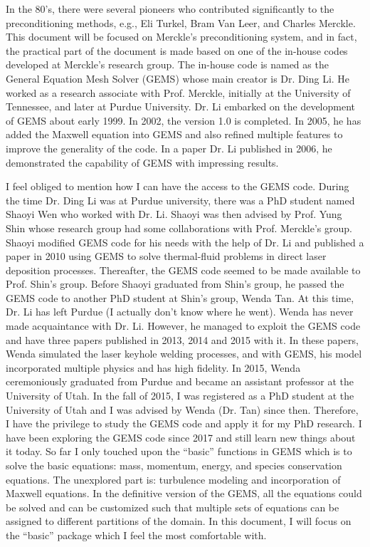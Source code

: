 \documentclass[12pt, letterpaper]{report}
\begin{document}
In the 80's, there were several pioneers who contributed significantly to the preconditioning
methods, e.g., Eli Turkel, Bram Van Leer, and Charles Merckle. This document will be focused on
Merckle's preconditioning system, and in fact, the practical part of the document is made based on
one of the in-house codes developed at Merckle's research group. The in-house code is named as the
General Equation Mesh Solver (GEMS) whose main creator is Dr. Ding Li. He worked as a research
associate with Prof. Merckle, initially at the University of Tennessee, and later at Purdue
University. Dr. Li embarked on the development of GEMS about early 1999. In 2002, the version 1.0 is
completed. In 2005, he has added the Maxwell equation into GEMS and also refined multiple features
to improve the generality of the code. In a paper Dr. Li published in 2006, he demonstrated the
capability of GEMS with impressing results.
\paraspace

I feel obliged to mention how I can have the access to the GEMS code. During the time Dr. Ding Li
was at Purdue university, there was a PhD student named Shaoyi Wen who worked with Dr. Li. Shaoyi
was then advised by Prof. Yung Shin whose research group had some collaborations with Prof.
Merckle's group. Shaoyi modified GEMS code for his needs with the help of Dr. Li and published a
paper in 2010 using GEMS to solve thermal-fluid problems in direct laser deposition processes.
Thereafter, the GEMS code seemed to be made available to Prof. Shin's group. Before Shaoyi graduated
from Shin's group, he passed the GEMS code to another PhD student at Shin's group, Wenda Tan. At
this time, Dr. Li has left Purdue (I actually don't know where he went). Wenda has never made
acquaintance with Dr. Li. However, he managed to exploit the GEMS code and have three papers
published in 2013, 2014 and 2015 with it. In these papers, Wenda simulated the laser keyhole welding
processes, and with GEMS, his model incorporated multiple physics and has high fidelity. In 2015,
Wenda ceremoniously graduated from Purdue and became an assistant professor at the University of
Utah. In the fall of 2015, I was registered as a PhD student at the University of Utah and I was
advised by Wenda (Dr. Tan) since then. Therefore, I have the privilege to study the GEMS code and
apply it for my PhD research. I have been exploring the GEMS code since 2017 and still learn new
things about it today. So far I only touched upon the ``basic'' functions in GEMS which is to solve
the basic equations: mass, momentum, energy, and species conservation equations. The unexplored part
is: turbulence modeling and incorporation of Maxwell equations. In the definitive version of the
GEMS, all the equations could be solved and can be customized such that multiple sets of equations
can be assigned to different partitions of the domain. In this document, I will focus on the
``basic'' package which I feel the most comfortable with.  \paraspace
\end{document}
